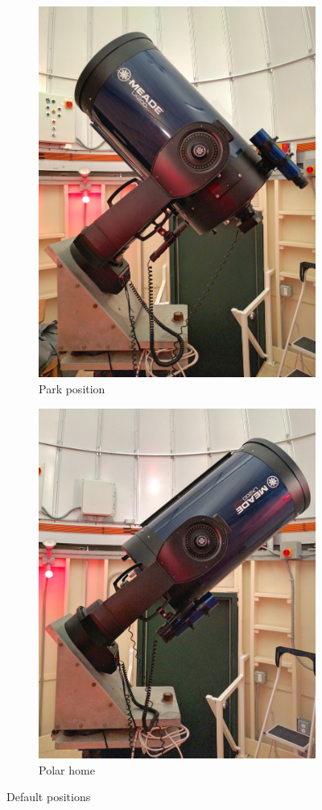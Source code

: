 \documentclass[12pt,titlepage]{article}
\begin{document}
\begin{figure}[H]
    \centering
    \begin{subfigure}[t]{0.5\textwidth}
        \centering
        \includegraphics[width=.8\textwidth]{./images/lx200/intro/park_side.jpg}
        \caption{Park position}
    \end{subfigure}%
    \begin{subfigure}[t]{0.5\textwidth}
        \centering
        \includegraphics[width=.85\textwidth]{./images/lx200/intro/polarhome_side.jpg}
        \caption{Polar home}
    \end{subfigure}
    \caption{Default positions}
\end{figure}
\end{document}

